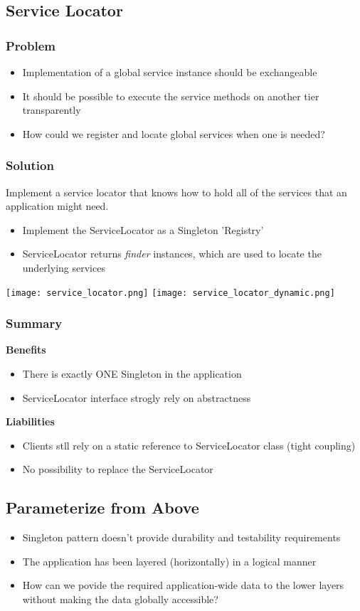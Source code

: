 \subsection{Service Locator}
\subsubsection{Problem}
\begin{itemize}
    \item Implementation of a global service instance should be exchangeable
    \item It should be possible to execute the service methods on another tier transparently
    \item How could we register and locate global services when one is needed?
\end{itemize}
\subsubsection{Solution}
Implement a service locator that knows how to hold all of the services that an application might need.
\begin{itemize}
    \item Implement the ServiceLocator as a Singleton 'Registry'
    \item ServiceLocator returns \textit{finder} instances, which are used to locate the underlying services
\end{itemize}
\texttt{[image: service\_locator.png]}
\texttt{[image: service\_locator\_dynamic.png]}
\subsubsection{Summary}
\textbf{Benefits}
\begin{itemize}
    \item There is exactly ONE Singleton in the application
    \item ServiceLocator interface strogly rely on abstractness
\end{itemize}
\textbf{Liabilities}
\begin{itemize}
    \item Clients stll rely on a static reference to ServiceLocator class (tight coupling)
    \item No possibility to replace the ServiceLocator
\end{itemize}

\subsection{Parameterize from Above}
\begin{itemize}
    \item Singleton pattern doesn't provide durability and testability requirements
    \item The application has been layered (horizontally) in a logical manner
    \item How can we povide the required application-wide data to the lower layers without making the data globally accessible?
\end{itemize}

